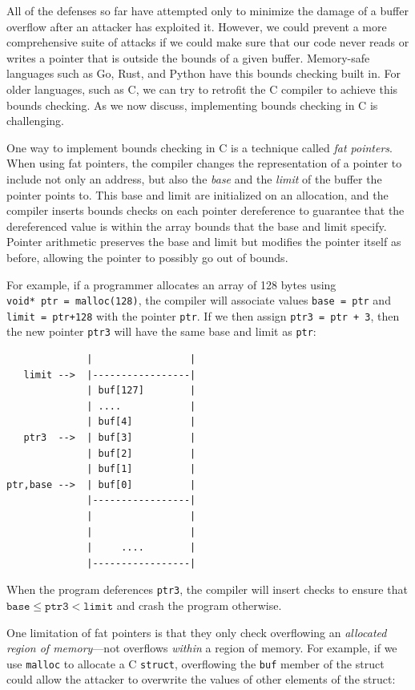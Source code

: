 \documentclass[
  letterpaper,
]{scrbook}
\theoremstyle{definition}
\theoremstyle{plain}
\theoremstyle{plain}
\theoremstyle{remark}
\begin{document}
All of the defenses so far have attempted only to minimize the damage of
a buffer overflow after an attacker has exploited it. However, we could
prevent a more comprehensive suite of attacks if we could make sure that
our code never reads or writes a pointer that is outside the bounds of a
given buffer. Memory-safe languages such as Go, Rust, and Python have
this bounds checking built in. For older languages, such as C, we can
try to retrofit the C compiler to achieve this bounds checking. As we
now discuss, implementing bounds checking in C is challenging.

One way to implement bounds checking in C is a technique called
\emph{fat pointers}. When using fat pointers, the compiler changes the
representation of a pointer to include not only an address, but also the
\emph{base} and the \emph{limit} of the buffer the pointer points to.
This base and limit are initialized on an allocation, and the compiler
inserts bounds checks on each pointer dereference to guarantee that the
dereferenced value is within the array bounds that the base and limit
specify. Pointer arithmetic preserves the base and limit but modifies
the pointer itself as before, allowing the pointer to possibly go out of
bounds.

For example, if a programmer allocates an array of 128 bytes using
\texttt{void*\ ptr\ =\ malloc(128)}, the compiler will associate values
\texttt{base\ =\ ptr} and \texttt{limit\ =\ ptr+128} with the pointer
\texttt{ptr}. If we then assign \texttt{ptr3\ =\ ptr\ +\ 3}, then the
new pointer \texttt{ptr3} will have the same base and limit as
\texttt{ptr}:

\begin{verbatim}
              |                 |
   limit -->  |-----------------|
              | buf[127]        |
              | ....            |
              | buf[4]          |
   ptr3  -->  | buf[3]          |
              | buf[2]          |
              | buf[1]          |
ptr,base -->  | buf[0]          |
              |-----------------|
              |                 |
              |                 |
              |     ....        |
              |-----------------|
\end{verbatim}

When the program deferences \texttt{ptr3}, the compiler will insert
checks to ensure that
\(\mathtt{base} \leq \mathtt{ptr3} < \mathtt{limit}\) and crash the
program otherwise.

One limitation of fat pointers is that they only check overflowing an
\emph{allocated region of memory}---not overflows \emph{within} a region
of memory. For example, if we use \texttt{malloc} to allocate a C
\texttt{struct}, overflowing the \texttt{buf} member of the struct could
allow the attacker to overwrite the values of other elements of the
struct:
\end{document}
